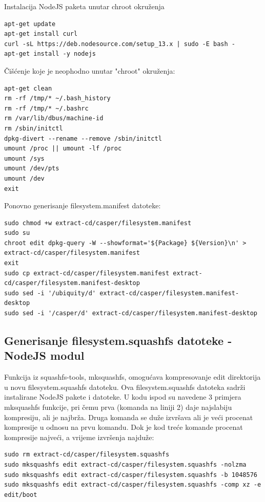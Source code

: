 \documentclass[12pt,vi]{mitthesis}
\begin{document}
\noindent
Instalacija NodeJS paketa unutar chroot okruženja\cite{nodejs-howto}
\begin{lstlisting}[style=BashInputStyle]
apt-get update
apt-get install curl
curl -sL https://deb.nodesource.com/setup_13.x | sudo -E bash -
apt-get install -y nodejs
\end{lstlisting}

\noindent
Čišćenje koje je neophodno unutar "chroot" okruženja:
\begin{lstlisting}[style=BashInputStyle]
apt-get clean
rm -rf /tmp/* ~/.bash_history
rm -rf /tmp/* ~/.bashrc
rm /var/lib/dbus/machine-id
rm /sbin/initctl
dpkg-divert --rename --remove /sbin/initctl
umount /proc || umount -lf /proc
umount /sys
umount /dev/pts
umount /dev
exit
\end{lstlisting}

\noindent
Ponovno generisanje filesystem.manifest datoteke:
\begin{lstlisting}[style=BashInputStyle]
sudo chmod +w extract-cd/casper/filesystem.manifest
sudo su
chroot edit dpkg-query -W --showformat='${Package} ${Version}\n' > extract-cd/casper/filesystem.manifest
exit
sudo cp extract-cd/casper/filesystem.manifest extract-cd/casper/filesystem.manifest-desktop
sudo sed -i '/ubiquity/d' extract-cd/casper/filesystem.manifest-desktop
sudo sed -i '/casper/d' extract-cd/casper/filesystem.manifest-desktop
\end{lstlisting}

\subsection*{Generisanje filesystem.squashfs datoteke - NodeJS modul}
\noindent
Funkcija iz squashfs-tools, mksquashfs, omogućava kompresovanje edit direktorija u novu filesystem.squashfs datoteku. Ova filesystem.squashfs datoteka sadrži instalirane NodeJS pakete i datoteke. U kodu ispod su navedene 3 primjera mksquashfs funkcije, pri čemu prva (komanda na liniji 2) daje najslabiju kompresiju, ali je najbrža. Druga komanda se duže izvršava ali je veći procenat kompresije u odnosu na prvu komandu. Dok je kod treće komande procenat kompresije najveći, a vrijeme izvršenja najduže:
\begin{lstlisting}[style=BashInputStyle]
sudo rm extract-cd/casper/filesystem.squashfs
sudo mksquashfs edit extract-cd/casper/filesystem.squashfs -nolzma 
sudo mksquashfs edit extract-cd/casper/filesystem.squashfs -b 1048576
sudo mksquashfs edit extract-cd/casper/filesystem.squashfs -comp xz -e edit/boot
\end{lstlisting}
\end{document}
